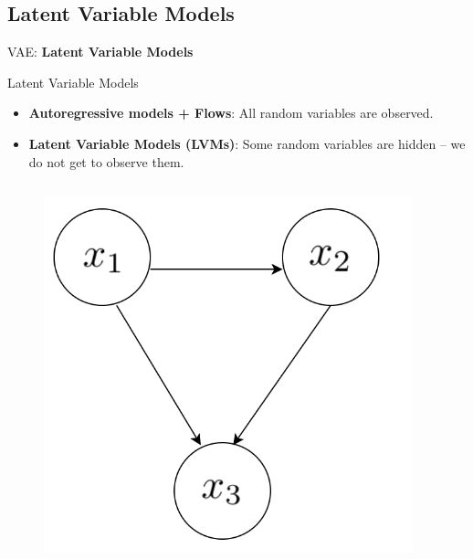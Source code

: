 \subsection{Latent Variable Models}
\begin{frame}{}
    \LARGE VAE: \textbf{Latent Variable Models}
\end{frame}

\begin{frame}[allowframebreaks]{Latent Variable Models}
\begin{itemize}
    \item \textbf{Autoregressive models + Flows}: All random variables are observed.
    \item \textbf{Latent Variable Models (LVMs)}: Some random variables are hidden -- we do not get to observe them.
\end{itemize}
\vspace{1em}
\begin{columns}
        \begin{column}{0.6\linewidth}
            \begin{figure}
                \centering
                \includegraphics[height=0.6\textheight]{images/vae/latent-graph-1.png}
            \end{figure}
        \end{column}
        \begin{column}{0.4\linewidth}

\end{column}
\end{columns}
\end{frame}
